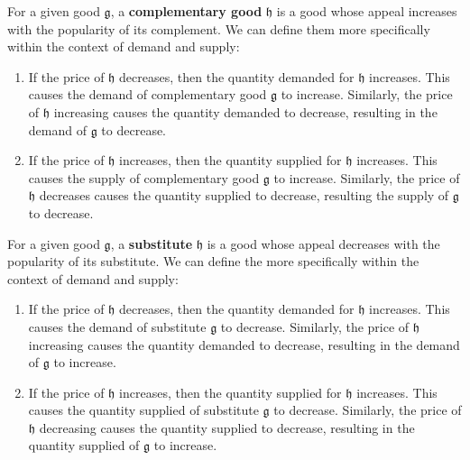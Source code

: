 \documentclass{article}
\begin{document}
      \begin{definition}[Complements]
        \label{def:complements}
        For a given good $\mathfrak{g}$, a \textbf{complementary good} $\mathfrak{h}$ is a good whose appeal increases with the popularity of its complement. We can define them more specifically within the context of demand and supply: 
        \begin{enumerate}
          \item If the price of $\mathfrak{h}$ decreases, then the quantity demanded for $\mathfrak{h}$ increases. This causes the demand of complementary good $\mathfrak{g}$ to increase. Similarly, the price of $\mathfrak{h}$ increasing causes the quantity demanded to decrease, resulting in the demand of $\mathfrak{g}$ to decrease. 
          \item If the price of $\mathfrak{h}$ increases, then the quantity supplied for $\mathfrak{h}$ increases. This causes the supply of complementary good $\mathfrak{g}$ to increase. Similarly, the price of $\mathfrak{h}$ decreases causes the quantity supplied to decrease, resulting the supply of $\mathfrak{g}$ to decrease. 
        \end{enumerate}
      \end{definition}

      \begin{definition}[Substitutes]
        \label{def:substitutes}
        For a given good $\mathfrak{g}$, a \textbf{substitute} $\mathfrak{h}$ is a good whose appeal decreases with the popularity of its substitute. We can define the more specifically within the context of demand and supply: 
        \begin{enumerate}
          \item If the price of $\mathfrak{h}$ decreases, then the quantity demanded for $\mathfrak{h}$ increases. This causes the demand of substitute $\mathfrak{g}$ to decrease. Similarly, the price of $\mathfrak{h}$ increasing causes the quantity demanded to decrease, resulting in the demand of $\mathfrak{g}$ to increase. 
          \item If the price of $\mathfrak{h}$ increases, then the quantity supplied for $\mathfrak{h}$ increases. This causes the quantity supplied of substitute $\mathfrak{g}$ to decrease. Similarly, the price of $\mathfrak{h}$ decreasing causes the quantity supplied to decrease, resulting in the quantity supplied of $\mathfrak{g}$ to increase. 
        \end{enumerate}
      \end{definition}
\end{document}
